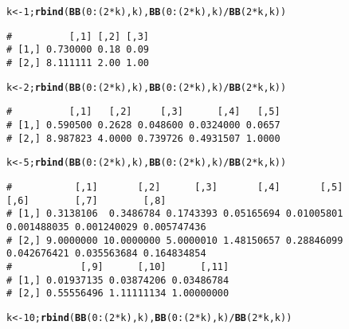 \documentclass{article}\usepackage[]{graphicx}\usepackage[]{color}
\makeatletter
\newcommand{\hlnum}[1]{\textcolor[rgb]{0.686,0.059,0.569}{#1}}%
\newcommand{\hlopt}[1]{\textcolor[rgb]{0,0,0}{#1}}%
\newcommand{\hlstd}[1]{\textcolor[rgb]{0.345,0.345,0.345}{#1}}%
\newcommand{\hlkwb}[1]{\textcolor[rgb]{0.69,0.353,0.396}{#1}}%
\newcommand{\hlkwd}[1]{\textcolor[rgb]{0.737,0.353,0.396}{\textbf{#1}}}%
\newenvironment{kframe}{%
 \def\at@end@of@kframe{}%
 \ifinner\ifhmode%
  \def\at@end@of@kframe{\end{minipage}}%
  \begin{minipage}{\columnwidth}%
 \fi\fi%
 \def\FrameCommand##1{\hskip\@totalleftmargin \hskip-\fboxsep
 \colorbox{shadecolor}{##1}\hskip-\fboxsep
     \hskip-\linewidth \hskip-\@totalleftmargin \hskip\columnwidth}%
 \MakeFramed {\advance\hsize-\width
   \@totalleftmargin\z@ \linewidth\hsize
   \@setminipage}}%
 {\par\unskip\endMakeFramed%
 \at@end@of@kframe}
\newenvironment{knitrout}{}{} %
\makeatother
\begin{document}
\begin{knitrout}\footnotesize
{}\color{fgcolor}\begin{kframe}
\begin{alltt}
\hlstd{k} \hlkwb{<-} \hlnum{1}\hlstd{;} \hlkwd{rbind}\hlstd{(}\hlkwd{BB}\hlstd{(}\hlnum{0}\hlopt{:}\hlstd{(}\hlnum{2}\hlopt{*}\hlstd{k), k) ,}\hlkwd{BB}\hlstd{(}\hlnum{0}\hlopt{:}\hlstd{(}\hlnum{2}\hlopt{*}\hlstd{k), k)}\hlopt{/}\hlkwd{BB}\hlstd{(}\hlnum{2}\hlopt{*}\hlstd{k, k))}
\end{alltt}
\begin{verbatim}
#          [,1] [,2] [,3]
# [1,] 0.730000 0.18 0.09
# [2,] 8.111111 2.00 1.00
\end{verbatim}
\begin{alltt}
\hlstd{k} \hlkwb{<-} \hlnum{2}\hlstd{;} \hlkwd{rbind}\hlstd{(}\hlkwd{BB}\hlstd{(}\hlnum{0}\hlopt{:}\hlstd{(}\hlnum{2}\hlopt{*}\hlstd{k), k) ,}\hlkwd{BB}\hlstd{(}\hlnum{0}\hlopt{:}\hlstd{(}\hlnum{2}\hlopt{*}\hlstd{k), k)}\hlopt{/}\hlkwd{BB}\hlstd{(}\hlnum{2}\hlopt{*}\hlstd{k, k))}
\end{alltt}
\begin{verbatim}
#          [,1]   [,2]     [,3]      [,4]   [,5]
# [1,] 0.590500 0.2628 0.048600 0.0324000 0.0657
# [2,] 8.987823 4.0000 0.739726 0.4931507 1.0000
\end{verbatim}
\begin{alltt}
\hlstd{k} \hlkwb{<-} \hlnum{5}\hlstd{;} \hlkwd{rbind}\hlstd{(}\hlkwd{BB}\hlstd{(}\hlnum{0}\hlopt{:}\hlstd{(}\hlnum{2}\hlopt{*}\hlstd{k), k) ,}\hlkwd{BB}\hlstd{(}\hlnum{0}\hlopt{:}\hlstd{(}\hlnum{2}\hlopt{*}\hlstd{k), k)}\hlopt{/}\hlkwd{BB}\hlstd{(}\hlnum{2}\hlopt{*}\hlstd{k, k))}
\end{alltt}
\begin{verbatim}
#           [,1]       [,2]      [,3]       [,4]       [,5]        [,6]        [,7]        [,8]
# [1,] 0.3138106  0.3486784 0.1743393 0.05165694 0.01005801 0.001488035 0.001240029 0.005747436
# [2,] 9.0000000 10.0000000 5.0000010 1.48150657 0.28846099 0.042676421 0.035563684 0.164834854
#            [,9]      [,10]      [,11]
# [1,] 0.01937135 0.03874206 0.03486784
# [2,] 0.55556496 1.11111134 1.00000000
\end{verbatim}
\begin{alltt}
\hlstd{k} \hlkwb{<-}\hlnum{10}\hlstd{;} \hlkwd{rbind}\hlstd{(}\hlkwd{BB}\hlstd{(}\hlnum{0}\hlopt{:}\hlstd{(}\hlnum{2}\hlopt{*}\hlstd{k), k) ,}\hlkwd{BB}\hlstd{(}\hlnum{0}\hlopt{:}\hlstd{(}\hlnum{2}\hlopt{*}\hlstd{k), k)}\hlopt{/}\hlkwd{BB}\hlstd{(}\hlnum{2}\hlopt{*}\hlstd{k, k))}

\end{alltt}
\end{kframe}
\end{knitrout}
\end{document}
